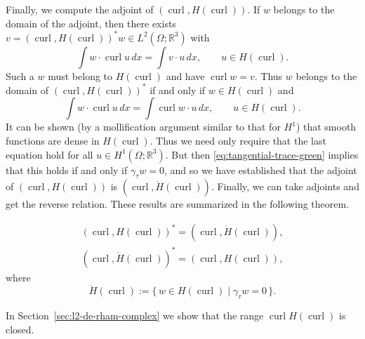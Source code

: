 {Finally, we compute the adjoint of $(\operatorname{curl},H(\operatorname{curl}))$. If $w$ belongs to the domain of the adjoint, then there exists $v=(\operatorname{curl},H(\operatorname{curl}))^*w\in L^2(\Omega;\mathbb R^3)$ with}
\[
\int w\cdot\operatorname{curl}u\,dx=\int v\cdot u\,dx,\qquad u\in H(\operatorname{curl}).
\]
{Such a $w$ must belong to $H(\operatorname{curl})$ and have $\operatorname{curl}w=v$. Thus $w$ belongs to the domain of $(\operatorname{curl},H(\operatorname{curl}))^*$ if and only if $w\in H(\operatorname{curl})$ and}
\[
\int w\cdot\operatorname{curl}u\,dx=\int\operatorname{curl}w\cdot u\,dx,\qquad u\in H(\operatorname{curl}).
\]
{It can be shown (by a mollification argument similar to that for $H^1$) that smooth functions are dense in $H(\operatorname{curl})$. Thus we need only require that the last equation hold for all $u\in H^1(\Omega;\mathbb R^3)$. But then \eqref{eq:tangential-trace-green} implies that this holds if and only if $\gamma_\tau w=0$, and so we have established that the adjoint of $(\operatorname{curl},H(\operatorname{curl}))$ is $(\operatorname{curl},\mathring H(\operatorname{curl}))$. Finally, we can take adjoints and get the reverse relation. These results are summarized in the following theorem.}

\begin{Theorem}\label{thm:curl-adjoints}
\[
\begin{gathered}
(\operatorname{curl},H(\operatorname{curl}))^*=(\operatorname{curl},\mathring H(\operatorname{curl})),\\
(\operatorname{curl},\mathring H(\operatorname{curl}))^*=(\operatorname{curl},H(\operatorname{curl})),
\end{gathered}
\]
{where}
\[
\mathring H(\operatorname{curl}):=\{\,w\in H(\operatorname{curl})\mid\gamma_\tau w=0\,\}.
\]
\end{Theorem}

{In Section~\ref{sec:l2-de-rham-complex} we show that the range $\operatorname{curl}H(\operatorname{curl})$ is closed.}

